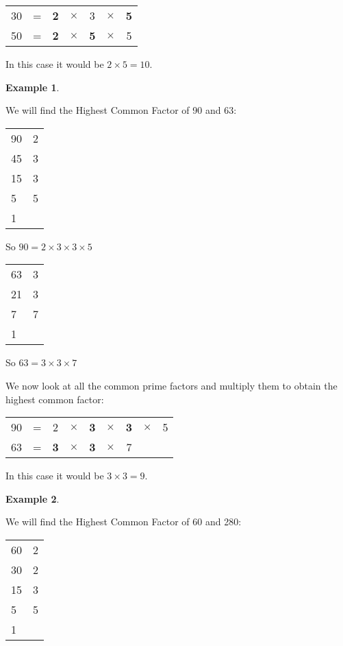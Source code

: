 \documentclass[11pt, oneside]{article}
\theoremstyle{definition}
\newtheorem{exmp}{Example}[section]
\begin{document}
\begin{tabular}{c c c c c c c}
30 & = & {\bf2} & $\times $ & 3 & $\times$  & {\bf5}  \\
50 & = & {\bf2} & $\times $ & {\bf5} & $\times$  & 5 
\end{tabular}

In this case it would be $2\times 5 = 10$.

\begin{exmp} \end{exmp}
We will find the Highest Common Factor of 90 and 63:

\begin{tabular}{ p{0.5cm} | p{1.5cm}}
90 & 2  \\
45 & 3  \\
15 & 3  \\
5 & 5  \\
1 &  
\end{tabular}

So $90 = 2 \times 3 \times 3 \times 5$

\bigbreak

\begin{tabular}{ p{0.5cm} | p{1.5cm}}
63 & 3  \\
21 & 3  \\
7 & 7  \\
1 & 
\end{tabular}

So $63 = 3 \times 3 \times 7$

We now look at all the common prime factors and multiply them to obtain the highest common factor:

\begin{tabular}{c c c c c c c c c}
90 & = & 2 & $\times $ & {\bf3} & $\times$  & {\bf3} & $\times$ & 5  \\
63 & = & {\bf3} & $\times $ & {\bf3} & $\times$  & 7 & &
\end{tabular}

In this case it would be $3\times 3 = 9$.


\begin{exmp} \end{exmp}
We will find the Highest Common Factor of 60 and 280:

\begin{tabular}{ p{0.5cm} | p{1.5cm}}
60 & 2  \\
30 & 2  \\
15 & 3  \\
5 & 5  \\
1 &  
\end{tabular}
\end{document}
